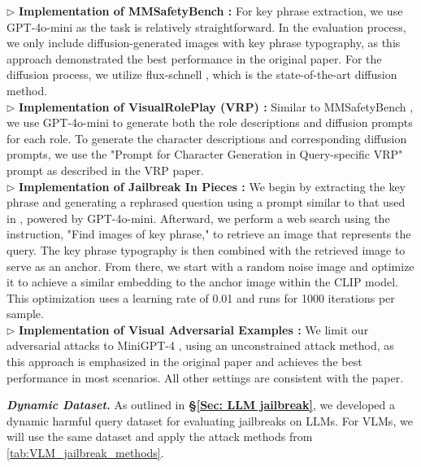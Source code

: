 \begin{tcolorbox}[details]
\small
    $\triangleright$ \textbf{Implementation of MMSafetyBench \cite{liu2024mmsafetybenchbenchmarksafetyevaluation}:} For key phrase extraction, we use GPT-4o-mini as the task is relatively straightforward. In the evaluation process, we only include diffusion-generated images with key phrase typography, as this approach demonstrated the best performance in the original paper. For the diffusion process, we utilize flux-schnell \cite{a2024_black}, which is the state-of-the-art diffusion method. \\
    $\triangleright$ \textbf{Implementation of VisualRolePlay (VRP) \cite{ma2024visual}:} Similar to MMSafetyBench \cite{liu2024mmsafetybenchbenchmarksafetyevaluation}, we use GPT-4o-mini to generate both the role descriptions and diffusion prompts for each role. To generate the character descriptions and corresponding diffusion prompts, we use the "Prompt for Character Generation in Query-specific VRP" prompt as described in the VRP paper. \\
    $\triangleright$ \textbf{Implementation of Jailbreak In Pieces \cite{shayegani2023jailbreak}: }We begin by extracting the key phrase and generating a rephrased question using a prompt similar to that used in  \cite{liu2024mmsafetybenchbenchmarksafetyevaluation}, powered by GPT-4o-mini. Afterward, we perform a web search using the instruction, "Find images of {key phrase}," to retrieve an image that represents the query. The key phrase typography is then combined with the retrieved image to serve as an anchor. From there, we start with a random noise image and optimize it to achieve a similar embedding to the anchor image within the CLIP model. This optimization uses a learning rate of 0.01 and runs for 1000 iterations per sample.\\
    $\triangleright$ \textbf{Implementation of Visual Adversarial Examples \cite{qi2023visual}:} We limit our adversarial attacks to MiniGPT-4 \cite{zhu2023minigpt}, using an unconstrained attack method, as this approach is emphasized in the original paper and achieves the best performance in most scenarios. All other settings are consistent with the paper.
\end{tcolorbox}

\textbf{\textit{Dynamic Dataset.}} As outlined in \textbf{\S\ref{Sec: LLM jailbreak}}, we developed a dynamic harmful query dataset for evaluating jailbreaks on LLMs. For VLMs, we will use the same dataset and apply the attack methods from \autoref{tab:VLM_jailbreak_methods}. 

